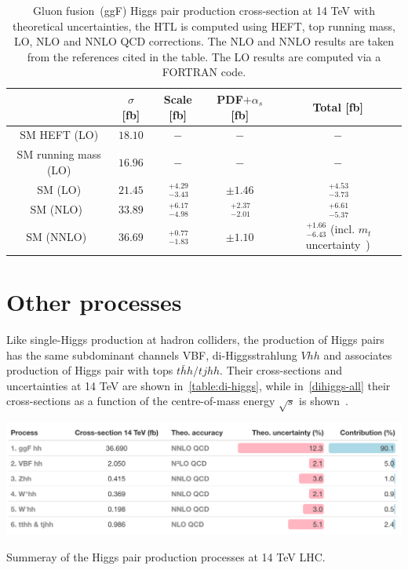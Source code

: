 \begin{table}
	\centering
	\begin{tabular}{ccccc}
		\toprule
		& $ \sigma$	[fb] & Scale [fb] & PDF$+\alpha_s$ [fb]& Total [fb] \\
		\midrule
		SM HEFT  (LO)      &  $ 18.10$    &   $-$      & $-$   &  $-$ \\
		SM   running mass (LO)  &  $ 16.96$    &   $ -$   & $-$   &  $-$ \\
		SM    (LO)  &  $ 21.45$    &   $ \,^{+4.29}_{-3.43}$   & $\pm 1.46$   &  $ \,^{+4.53}_{-3.73}$ \\
		SM   (NLO)~\cite{Baglio:2012np}  &  $ 33.89$   &   $ \,^{+6.17}_{-4.98}$   & $ \,^{+2.37}_{-2.01}$   &  $ \,^{+6.61}_{-5.37}$ \\
		SM   (NNLO)~\cite{Grazzini:2018bsd}  &  $36.69$    &    $ \,^{+0.77}_{-1.83}$   & $\pm 1.10$   &  $ \,^{+1.66}_{-6.43}$ {\tiny(incl. $m_t$ uncertainty~\cite{Baglio:2020wgt})} \\
		\bottomrule
	\end{tabular}
	\caption{Gluon fusion~(ggF) Higgs pair production cross-section at 14 TeV with theoretical  uncertainties, the HTL is computed using HEFT, top running mass, LO, NLO and NNLO QCD corrections. The NLO and NNLO results are taken from the references cited in the table. The LO results are computed via a FORTRAN code.}
	\label{ggf_xsres}
\end{table}

\section{Other processes\label{otherhh}  }
Like single-Higgs production at hadron colliders, the production of Higgs pairs has the same subdominant channels VBF, di-Higgsstrahlung $ Vhh$ and associates production of Higgs pair with tops $t\bar hh /t j hh$. Their cross-sections and uncertainties at 14 TeV are shown in~\autoref{table:di-higgs}, while in~\autoref{dihiggs-all} their cross-sections as a function of the centre-of-mass energy $\sqrt{s}$ is shown~\cite{DiMicco:2019ngk}. 
\begin{table}[htbp!]
	\includegraphics[width=1\textwidth]{hh-table}
	\caption{ Summeray of the Higgs pair production processes at 14 TeV LHC. \label{table:di-higgs} }
\end{table}
